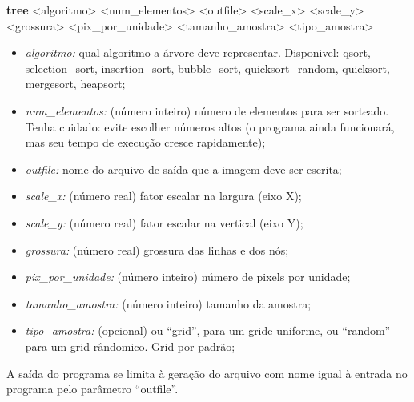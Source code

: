 \documentclass[12pt,a4paper]{article}
\begin{document}
	\indent \textbf{tree} <algoritmo> <num\_elementos> <outfile> <scale\_x> <scale\_y> <grossura> <pix\_por\_unidade> <tamanho\_amostra> <tipo\_amostra>\\

	\begin{itemize}
	\item \textit{algoritmo:} qual algoritmo a árvore deve representar. Disponivel: qsort, selection\_sort, insertion\_sort, bubble\_sort, quicksort\_random, quicksort, mergesort, heapsort;
	\item \textit{num\_elementos:} (número inteiro) número de elementos para ser sorteado. Tenha cuidado: evite escolher números altos (o programa ainda funcionará, mas seu tempo de execução cresce rapidamente);
	\item \textit{outfile:} nome do arquivo de saída que a imagem deve ser escrita;
	\item \textit{scale\_x:} (número real) fator escalar na largura (eixo X);
	\item \textit{scale\_y:} (número real) fator escalar na vertical (eixo Y);
	\item \textit{grossura:} (número real) grossura das linhas e dos nós;
	\item \textit{pix\_por\_unidade:} (número inteiro) número de pixels por unidade;
	\item \textit{tamanho\_amostra:} (número inteiro) tamanho da amostra;
	\item \textit{tipo\_amostra:} (opcional) ou “grid”, para um gride uniforme, ou “random” para um grid rândomico. Grid por padrão;
	\end{itemize}
	\indent A saída do programa se limita à geração do arquivo com nome igual à entrada no programa pelo parâmetro “outfile”.
\end{document}
